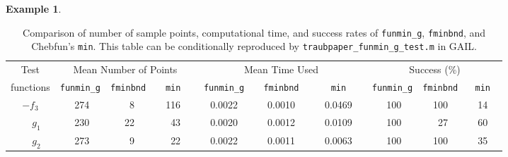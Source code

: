 \documentclass[review]{elsarticle}
\theoremstyle{definition}
\newtheorem{exmp}{Example}
\newcommand{\funming}{\texttt{funmin\_g}\xspace}
\newcommand{\fminbnd}{\texttt{fminbnd}\xspace}
\begin{document}
\begin{exmp}
%
\begin{table}[tb]
	\centering
	\caption{Comparison of number of sample points, computational time,  and success
		rates of \funming, \fminbnd, and
		Chebfun's \texttt{min}.
		This table can be conditionally reproduced by
		\texttt{traubpaper\_funmin\_g\_test.m} in GAIL.}
	\label{tab:funmingVsfminbndVsChebfun}
	{\footnotesize

	\setlength{\tabcolsep}{.3em}
		\begin{tabular}{ccrccrccrccrccrccrccrccrccrc}		
			Test      &    \multicolumn{9}{c}{Mean Number of Points}   & \multicolumn{9}{c}{Mean Time Used}  & \multicolumn{9}{c}{Success (\%)}
			\\  functions &  \multicolumn{3}{c}{\funming} &  \multicolumn{3}{c}{\fminbnd}  &  \multicolumn{3}{c}{\texttt{min}}  
		  &  \multicolumn{3}{c}{\funming}  &  \multicolumn{3}{c}{\fminbnd }  &  \multicolumn{3}{c}{\texttt{min} }  &  \multicolumn{3}{c}{\funming} & \multicolumn{3}{c}{\fminbnd} & \multicolumn{3}{c}{\texttt{min}}
			\\ \toprule
			$-f_3$   &&  274   &&&   8   &&&  116     &&&   0.0022   &&&   0.0010    &&& 0.0469  &&&   100   &&&  100   &&&  14 
			\\ $\phantom{-}g_1$   && 230 &&&  22   &&&    43    &&& 0.0020  &&&    0.0012   &&&  0.0109 &&&    100   &&&   27   &&&  60 
			\\ $\phantom{-}g_2$   &&  273 &&&   9   &&&   22    &&&  0.0022   &&&   0.0011    &&&  0.0063 &&&    100   &&& 100   &&&  35 
		\end{tabular}
				        
}
\end{table}
\end{exmp}
\end{document}

